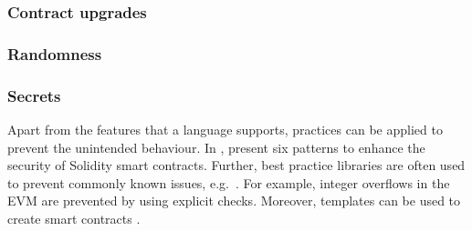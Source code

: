 \subsubsection{Contract upgrades}

\subsubsection{Randomness}

\subsubsection{Secrets}

Apart from the features that a language supports, practices can be applied to prevent the unintended behaviour.
In \cite{Wohrer2018}, present six patterns to enhance the security of Solidity smart contracts.
Further, best practice libraries are often used to prevent commonly known issues, e.g.\ \cite{ConsenSys2018Security}.
For example, integer overflows in the EVM are prevented by using explicit checks.
Moreover, templates can be used to create smart contracts \cite{Clack2016}.
